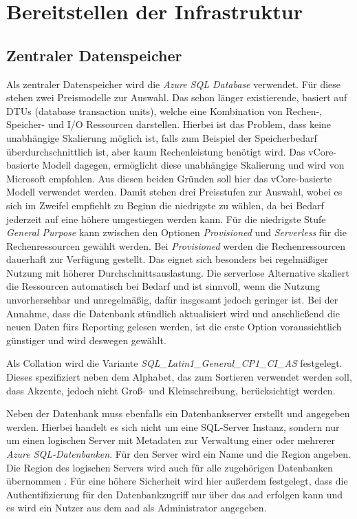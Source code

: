 \section{Bereitstellen der Infrastruktur} \label{sec:umsetzen:bereitstellenInfrastruktur}

\subsection{Zentraler Datenspeicher} \label{subsec:umsetzen:bereitstellenInfrastruktur:datenspeicher}
Als zentraler Datenspeicher wird die \textit{Azure SQL Database} verwendet. Für diese stehen zwei Preismodelle zur Auswahl. Das schon länger existierende, basiert auf DTUs (database transaction units), welche eine Kombination von Rechen-, Speicher- und I/O Ressourcen darstellen. Hierbei ist das Problem, dass keine unabhängige Skalierung möglich ist, falls zum Beispiel der Speicherbedarf überdurchschnittlich ist, aber kaum Rechenleistung benötigt wird. Das vCore-basierte Modell dagegen, ermöglicht diese unabhängige Skalierung und wird von Microsoft empfohlen. Aus diesen beiden Gründen soll hier das vCore-basierte Modell verwendet werden. Damit stehen drei Preisstufen zur Auswahl, wobei es sich im Zweifel empfiehlt zu Beginn die niedrigste zu wählen, da bei Bedarf jederzeit auf eine höhere umgestiegen werden kann. Für die niedrigste Stufe \textit{General Purpose} kann zwischen den Optionen \textit{Provisioned} und \textit{Serverless} für die Rechenressourcen gewählt werden. Bei \textit{Provisioned} werden die Rechenressourcen dauerhaft zur Verfügung gestellt. Das eignet sich besonders bei regelmäßiger Nutzung mit höherer Durchschnittsauslastung. Die serverlose Alternative skaliert die Ressourcen automatisch bei Bedarf und ist sinnvoll, wenn die Nutzung unvorhersehbar und unregelmäßig, dafür insgesamt jedoch geringer ist. Bei der Annahme, dass die Datenbank stündlich aktualisiert wird und anschließend die neuen Daten fürs Reporting gelesen werden, ist die erste Option voraussichtlich günstiger und wird deswegen gewählt.

Als Collation wird die Variante \textit{SQL{\_}Latin1{\_}General{\_}CP1{\_}CI{\_}AS} festgelegt. Dieses spezifiziert neben dem Alphabet, das zum Sortieren verwendet werden soll, dass Akzente, jedoch nicht Groß- und Kleinschreibung, berücksichtigt werden. \cite[vgl.][]{mauri_azure_2021}

Neben der Datenbank muss ebenfalls ein Datenbankserver erstellt und angegeben werden. Hierbei handelt es sich nicht um eine SQL-Server Instanz, sondern nur um einen logischen Server mit Metadaten zur Verwaltung einer oder mehrerer \textit{Azure SQL-Datenbanken}. Für den Server wird ein Name und die Region angeben. Die Region des logischen Servers wird auch für alle zugehörigen Datenbanken übernommen \cite{ward_azure_2021}. Für eine höhere Sicherheit wird hier außerdem festgelegt, dass die Authentifizierung für den Datenbankzugriff nur über das \ac{aad} erfolgen kann und es wird ein Nutzer aus dem \ac{aad} als Administrator angegeben.